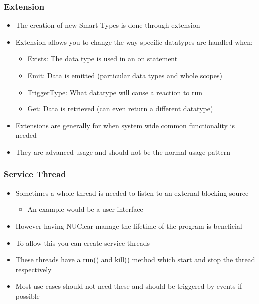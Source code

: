 \documentclass{beamer}
\begin{document}
\begin{frame}
	\frametitle{Extension}
	\begin{itemize}
		\item The creation of new Smart Types is done through extension
		\item Extension allows you to change the way specific datatypes are handled when:
			\begin{itemize}
				\item Exists: The data type is used in an on statement
				\item Emit: Data is emitted (particular data types and whole scopes)
				\item TriggerType: What datatype will cause a reaction to run
				\item Get: Data is retrieved (can even return a different datatype)
			\end{itemize}
		\item Extensions are generally for when system wide common functionality is needed
		\item They are advanced usage and should not be the normal usage pattern
	\end{itemize}
\end{frame}

\begin{frame}
	\frametitle{Service Thread}
	\begin{itemize}
		\item Sometimes a whole thread is needed to listen to an external blocking source
			\begin{itemize}
				\item An example would be a user interface
			\end{itemize}
		\item However having NUClear manage the lifetime of the program is beneficial
		\item To allow this you can create service threads
		\item These threads have a run() and kill() method which start and stop the thread respectively
		\item Most use cases should not need these and should be triggered by events if possible
	\end{itemize}
\end{frame}
\end{document}
